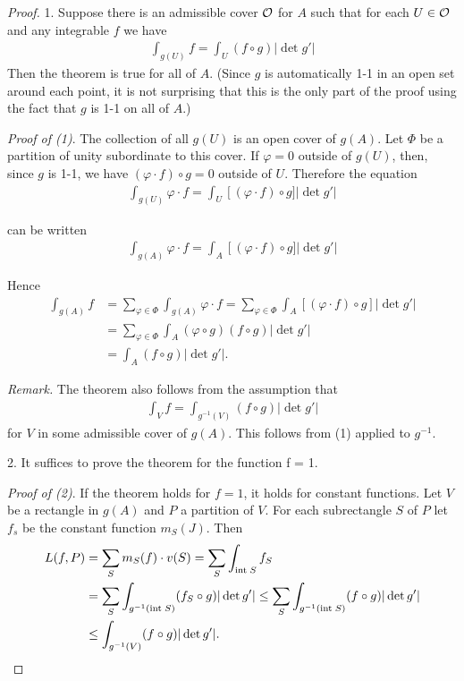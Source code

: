 \begin{proof}
1. Suppose there is an admissible cover $\mathcal{O}$ for $A$ such that
for each $U \in \mathcal{O}$ and any integrable $f$ we have
\begin{align*}
    \int_{g(U)} f = \int_U (f\circ g)|\det g'|
\end{align*}
Then the theorem is true for all of $A$. (Since $g$ is automatically 1-1 in an open set 
around each point, it is not surprising that this is the only part of the proof using the fact
that $g$ is 1-1 on all of $A$.)

\textit{Proof of (1)}. The collection of all $g(U)$ is an open cover of
$g(A)$. Let $\Phi$ be a partition of unity subordinate to this cover.
If $\varphi = 0$ outside of $g(U)$, then, since $g$ is 1-1, we have 
$(\varphi\cdot f)\circ g =0$ outside of $U$. Therefore the equation 
\begin{align*}
    \int_{{g}({U})}{\varphi}\cdot{f}=\int_{{U}}\left[({\varphi}\cdot{f})\circ{g}]\right|\det g'|
\end{align*}

can be written 
\begin{align*}
    \int_{{g}({A})}{\varphi}\cdot{f}=\int_{{A}}\left[({\varphi}\cdot{f})\circ{g}]\right|\det g'|
\end{align*}

Hence 
\begin{align*}
    \int_{g(A)}^{}{f} 
    & = \sum_{\varphi\in\Phi}^{}{\int_{g(A)} \varphi\cdot f} 
        = \sum_{\varphi\in\Phi}^{}{\int_A [(\varphi\cdot f)\circ g] |\det g'|} \\
    & = \sum_{\varphi\in\Phi}^{}{\int_A (\varphi\circ g)(f \circ g) |\det g'|}\\
    & = \int_A (f\circ g) |\det g'|.
\end{align*}

\textit{Remark.} The theorem also follows from the assumption that
\begin{align*}
  \int_Vf = \int_{g^{-1}(V)} (f\circ g) |\det g'|
\end{align*}
for $V$ in some admissible cover of $g(A)$. This follows from (1)
applied to $g^{-1}$.

2. It suffices to prove the theorem for the function f = 1.\par 
\textit{Proof of (2)}. If the theorem holds for $f = 1$, it holds for
constant functions. Let $V$ be a rectangle in $g(A)$ and $P$ a 
partition of $V$. For each subrectangle $S$ of $P$ let $f_s$ be the 
constant function $m_S(J)$. Then
\begin{align*}
  L(f, P) 
  & = \sum_{S}^{}{m_S(f)\cdot v(S)} = \sum_{S }^{}{\int_{\mathrm{int}\; S} f_S} \\
  & = \sum_{S }^{}{\int_{g^{-1}(\mathrm{int}\; S)} (f_S\circ g)|\det g'|}
      \le \sum_{S}^{}{\int_{g^{-1}(\mathrm{int}\; S)} (f\circ g)|\det g'|} \\
  & \le \int_{g^{-1}(V)} (f\circ g)|\det g'|.
\end{align*}


\end{proof}

